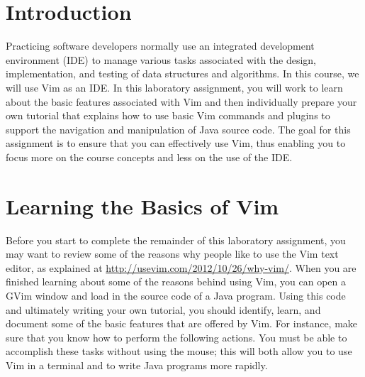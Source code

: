 


\usepackage[compact]{titlesec}



\section*{Introduction}

Practicing software developers normally use an integrated development environment (IDE) to manage various tasks
associated with the design, implementation, and testing of data structures and algorithms. In this course, we will use
Vim as an IDE.  In this laboratory assignment, you will work to learn about the basic features associated with Vim and
then individually prepare your own tutorial that explains how to use basic Vim commands and plugins to support the
navigation and manipulation of Java source code.  The goal for this assignment is to ensure that you can effectively use
Vim, thus enabling you to focus more on the course concepts and less on the use of the IDE.



\section*{Learning the Basics of Vim}

Before you start to complete the remainder of this laboratory assignment, you may want to review some of the reasons why
people like to use the Vim text editor, as explained at \url{http://usevim.com/2012/10/26/why-vim/}.  When you are
finished learning about some of the reasons behind using Vim, you can open a GVim window and load in the source code of
a Java program. Using this code and ultimately writing your own tutorial, you should identify, learn, and document
some of the basic features that are offered by Vim.  For instance, make sure that you know how to perform the following
actions. You must be able to accomplish these tasks without using the mouse; this will both allow you
to use Vim in a terminal and to write Java programs more rapidly.

